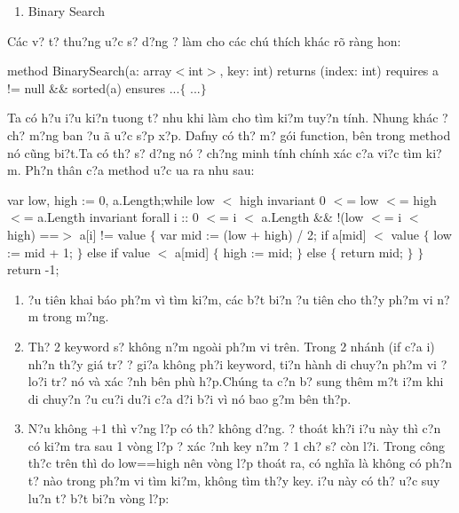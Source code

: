 \documentclass{article} %
\begin{document}
\begin{enumerate}
\item  Binary Search\underbar{}
\end{enumerate}

\noindent C\'{a}c v? t? thu?ng {\dj}u?c s? d?ng {\dj}? l\`{a}m cho c\'{a}c ch\'{u} th\'{i}ch kh\'{a}c r\~{o} r\`{a}ng hon:

\noindent method BinarySearch(a: array$<$int$>$, key: int) returns (index: int)   requires a != null \&\& sorted(a)   ensures ...$\{$   ...$\}$

Ta c\'{o} h?u {\dj}i?u ki?n tuong t? nhu khi l\`{a}m cho t\`{i}m ki?m tuy?n t\'{i}nh. Nhung kh\'{a}c ? ch? m?ng ban {\dj}?u {\dj}\~{a} {\dj}u?c s?p x?p. Dafny c\'{o} th? m? g\'{o}i function, b\^{e}n trong method n\'{o} c\~{u}ng bi?t.Ta c\'{o} th? s? d?ng n\'{o} {\dj}? ch?ng minh t\'{i}nh ch\'{i}nh x\'{a}c c?a vi?c t\`{i}m ki?m. Ph?n th\^{a}n c?a method {\dj}u?c {\dj}ua ra nhu sau:

\noindent var low, high := 0, a.Length;while low $<$ high      invariant 0 $<$= low $<$= high $<$= a.Length      invariant forall i ::         0 $<$= i $<$ a.Length \&\& !(low $<$= i $<$ high) ==$>$ a[i] != value   $\{$      var mid := (low + high) / 2;      if a[mid] $<$ value      $\{$         low := mid + 1;      $\}$      else if value $<$ a[mid]      $\{$         high := mid;      $\}$      else      $\{$         return mid;      $\}$   $\}$   return -1;

\begin{enumerate}
\item  {\DJ}?u ti\^{e}n khai b\'{a}o ph?m v\`{i} t\`{i}m ki?m, c\'{a}c b?t bi?n {\dj}?u ti\^{e}n cho th?y ph?m vi n?m trong m?ng.

\item  Th? 2 keyword s? kh\^{o}ng n?m ngo\`{a}i ph?m vi tr\^{e}n. Trong 2 nh\'{a}nh (if c?a i) nh?n th?y gi\'{a} tr? ? gi?a kh\^{o}ng ph?i keyword, ti?n h\`{a}nh di chuy?n ph?m vi {\dj}? lo?i tr? n\'{o} v\`{a} x\'{a}c {\dj}?nh b\^{e}n ph\`{u} h?p.Ch\'{u}ng ta c?n b? sung th\^{e}m m?t {\dj}i?m khi di chuy?n {\dj}?u cu?i du?i c?a d?i b?i v\`{i} n\'{o} bao g?m b\^{e}n th?p.

\item  N?u kh\^{o}ng +1 th\`{i} v?ng l?p c\'{o} th? kh\^{o}ng d?ng. {\DJ}? tho\'{a}t kh?i {\dj}i?u n\`{a}y th\`{i} c?n c\'{o} ki?m tra sau 1 v\`{o}ng l?p {\dj}? x\'{a}c {\dj}?nh key n?m ? 1 ch? s? c\`{o}n l?i. Trong c\^{o}ng th?c tr\^{e}n th\`{i} do low==high n\^{e}n v\`{o}ng l?p tho\'{a}t ra, c\'{o} ngh\~{i}a l\`{a} kh\^{o}ng c\'{o} ph?n t? n\`{a}o trong ph?m vi t\`{i}m ki?m, kh\^{o}ng t\`{i}m th?y key. {\DJ}i?u n\`{a}y c\'{o} th? {\dj}u?c suy lu?n t? b?t bi?n v\`{o}ng l?p: 
\end{enumerate}
\end{document}
